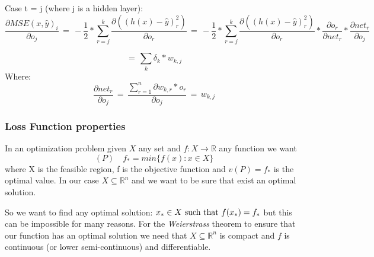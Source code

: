 Case t = j (where j is a hidden layer):
\begin{equation*}
\frac{\partial MSE(x, \hat{y})_i}{\partial o_{j}} \,
 = \, -\frac{1}{2} * \sum_{r=j}^k\frac{ \partial((h(x) - \widehat{y})_{r}^2)}{\partial o_{r}} \, 
= \, -\frac{1}{2} * \sum_{r=j}^k\frac{ \partial((h(x) - \widehat{y})_{r}^2)}{\partial o_{r}} * \frac{\partial o_{r}}{\partial net_{r}} * \frac{\partial net_{r}}{\partial o_{j}}
\end{equation*}

\begin{equation*}
= \, \sum_{k} \delta_{k} * w_{k,j}
\end{equation*}
Where:
\begin{equation*}
\frac{\partial net_{r}}{\partial o_{j}} \, = \, \frac{\sum_{r=1}^n\partial w_{k,r}*o_{r}}{\partial o_{j}} \, = \,  w_{k,j}
\end{equation*}

\subsubsection{Loss Function properties}
\label{LF:Properties}
In an optimization problem given $X$ any set and $f: X \rightarrow \mathbb{R}$ any function we want
\begin{equation}
(P) \quad f_{*} = min \{f(x) : x \in X\}
\end{equation}
where X is the feasible region, f is the objective function and $v(P) = f_{*}$ is the optimal value. In our case $X \subseteq \mathbb{R}^{n}$ and we want to be sure that exist an optimal solution.

So we want to find any optimal solution: $x_{*} \in X  \textnormal{ such that } f(x_{*}) = f_{*}$ but this can be impossible for many reasons. For the \textit{Weierstrass} theorem to ensure that our function has an optimal solution we need that $X \subseteq \mathbb{R}^{n}$ is compact and $f$ is continuous (or lower semi-continuous) and differentiable. 

